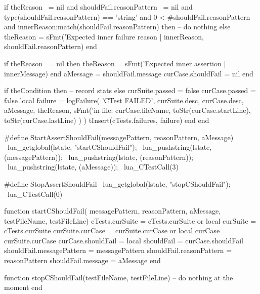     if theReason ~= nil
      and shouldFail.reasonPattern ~= nil
      and type(shouldFail.reasonPattern) == 'string'
      and 0 < #shouldFail.reasonPattern
      and innerReason:match(shouldFail.reasonPattern) then
      -- do nothing
    else
      theReason = sFmt('Expected inner failure reason [%
        innerReason, shouldFail.reasonPattern)
    end
    
    if theReason ~= nil then
      theReason = sFmt('Expected inner assertion [%
        innerMessage)
    end
    aMessage = shouldFail.message
    curCase.shouldFail = nil
  end
  
  if theCondition then
    -- record stats
  else
    curSuite.passed = false
    curCase.passed  = false
    local failure = logFailure(
      'CTest FAILED',
      curSuite.desc,
      curCase.desc,
      aMessage,
      theReason,
      sFmt('in file: %
        curCase.fileName,
        toStr(curCase.startLine),
        toStr(curCase.lastLine)
      )
    )
    tInsert(cTests.failures, failure)
  end
end
\stopLuaCode


\startCHeader
#define StartAssertShouldFail(messagePattern, reasonPattern, aMessage) \
  lua_getglobal(lstate, "startCShouldFail");                           \
  lua_pushstring(lstate, (messagePattern));                            \
  lua_pushstring(lstate, (reasonPattern));                             \
  lua_pushstring(lstate, (aMessage));                                  \
  lua_CTestCall(3)

#define StopAssertShouldFail                \
  lua_getglobal(lstate, "stopCShouldFail"); \
  lua_CTestCall(0)
\stopCHeader

\startLuaCode
function startCShouldFail(
  messagePattern, reasonPattern, aMessage,
  testFileName, testFileLine)
  cTests.curSuite    = cTests.curSuite or { }
  local curSuite     = cTests.curSuite
  curSuite.curCase   = curSuite.curCase or { }
  local curCase      = curSuite.curCase
  curCase.shouldFail = { }
  local shouldFail   = curCase.shouldFail
  shouldFail.messagePattern = messagePattern
  shouldFail.reasonPattern  = reasonPattern
  shouldFail.message        = aMessage
end

function stopCShouldFail(testFileName, testFileLine)
  -- do nothing at the moment
end
\stopLuaCode

\stopTestSuite

\startTestSuite[assertFail]

